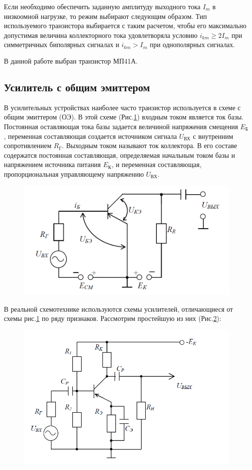 Если необходимо обеспечить заданную амплитуду выходного тока $I_m$ в низкоомной нагрузке, то режим выбирают следующим образом. Тип используемого транзистора выбирается с таким расчетом, чтобы его максимально допустимая величина коллекторного тока удовлетворяла условию $i_{km}\geqslant 2I_m$ при симметричных биполярных сигналах и $i_{km}>I_m$ при однополярных сигналах.

В данной работе выбран транзистор МП41А.

\subsection{Усилитель с общим эмиттером}
В усилительных устройствах наиболее часто транзистор используется в схеме с общим эмиттером (ОЭ). В этой схеме (Рис.\ref{fig:1}) входным током является ток базы. Постоянная оставляющая тока базы задается величиной напряжения смещения $E_{\text{Б}}$, переменная составляющая создается источником сигнала $U_{\text{ВХ}}$ с внутренним сопротивлением $R_{\text{Г}}$. Выходным током называют ток коллектора. В его составе содержатся постоянная составляющая, определяемая начальным током базы и напряжением источника питания $E_{\text{К}}$, и переменная составляющая, пропорциональная управляющему напряжению $U_{\text{ВХ}}$.

\begin{figure}[h]
	\centering
	\includegraphics[width=0.5\linewidth]{fig/fig1}
	\caption{}
	\label{fig:1}
\end{figure}

 В реальной схемотехнике используются схемы усилителей, отличающиеся от схемы рис.\ref{fig:1} по ряду признаков. Рассмотрим простейшую из них (Рис.\ref{fig:2}):

\begin{figure}[h]
	\centering
	\includegraphics[width=0.5\linewidth]{fig/fig2}
	\caption{}
	\label{fig:2}
\end{figure}

